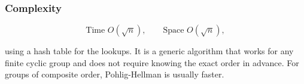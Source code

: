 \subsubsection{Complexity}

\begin{equation}
    \text{Time } O(\sqrt{n}), \qquad \text{Space } O(\sqrt{n}),
\end{equation}

using a hash table for the lookups. It is a generic algorithm that works for any finite
cyclic group and does not require knowing the exact order in advance. For groups of
composite order, Pohlig-Hellman is usually faster.
